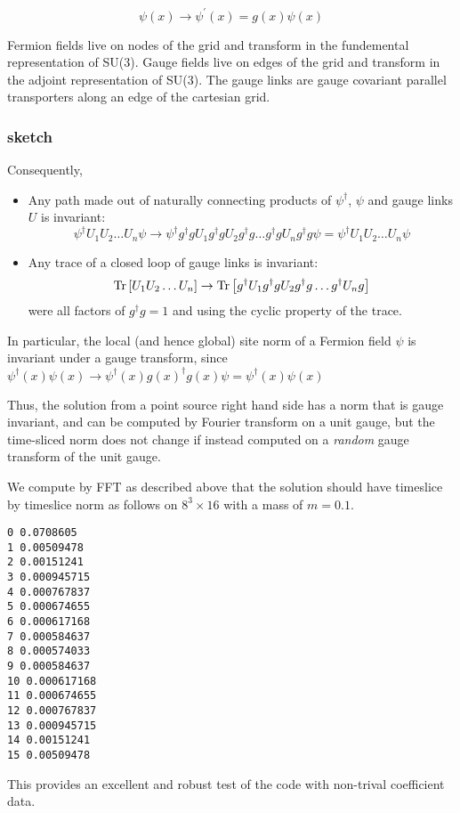 \documentclass[letter,10pt]{report}
\begin{document}
$$\psi(x) \to \psi^\prime(x) = g(x) \psi(x)$$

Fermion fields live on nodes of the grid and transform in the fundemental representation of SU(3).
Gauge fields live on edges of the grid and transform in the adjoint representation of SU(3).
The gauge links are gauge covariant parallel transporters along an edge of the cartesian grid.

\subsubsection{sketch}
Consequently,
\begin{itemize}
\item Any path made out of naturally connecting products of $\psi^\dagger$, $\psi$ and gauge links $U$ is invariant:
$$\psi^\dagger U_1 U_2 \ldots U_n \psi \to \psi^\dagger g^\dagger g U_1 g^\dagger g U_2  g^\dagger g \ldots   g^\dagger g U_n g^\dagger g \psi =
 \psi^\dagger U_1 U_2 \ldots U_n \psi$$
\item Any trace of a closed loop of gauge links is invariant:
  $$
  {\rm Tr}\left[ U_1 U_2 \ldots U_n \right] \to   {\rm Tr}\left[g^\dagger U_1 g^\dagger g U_2 g^\dagger g \ldots g^\dagger U_n g \right]
  $$
were all factors of $g^\dagger g = 1$ and using the cyclic property of the trace.
\end{itemize}

In particular, the local (and hence global) site norm of a Fermion field $\psi$ is invariant under a gauge transform,
since $\psi^\dagger(x) \psi(x) \to \psi^\dagger(x) g(x)^\dagger g(x) \psi = \psi^\dagger(x) \psi(x)$

Thus, the solution from a point source right hand side has a norm that is gauge invariant, and can be computed by Fourier
transform on a unit gauge, but the time-sliced norm does not change if instead computed on a \emph{random} gauge transform
of the unit gauge.

We compute by FFT as described above that the solution should have timeslice by timeslice norm as follows on $8^3\times 16$ with a
mass of $m=0.1$.

\begin{verbatim}
0 0.0708605
1 0.00509478
2 0.00151241
3 0.000945715
4 0.000767837
5 0.000674655
6 0.000617168
7 0.000584637
8 0.000574033
9 0.000584637
10 0.000617168
11 0.000674655
12 0.000767837
13 0.000945715
14 0.00151241
15 0.00509478
\end{verbatim}

This provides an excellent and robust test of the code with non-trival coefficient data.
\end{document}
